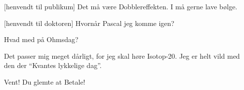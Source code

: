 \documentclass[11pt]{article}
\begin{document}
\begin{sketch}
 [henvendt til publikum] Det må være {\sc Dobblereffekten}.
I må gerne lave {\sc bølge}.

 [henvendt til doktoren] Hvornår {\sc Pascal} jeg komme igen?

 Hvad med på {\sc Ohm}sdag?

 Det passer mig meget dårligt, for jeg skal høre
{\sc Isotop}-20. Jeg er helt vild med den der ``{\sc Kvant}es lykkelige dag''.


 Vent! Du glemte at {\sc Beta}le!


\end{sketch}
\end{document}
